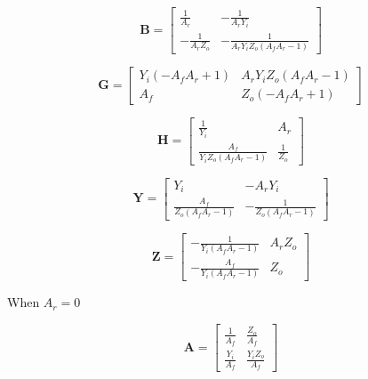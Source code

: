 \documentclass[a4paper, 12pt]{article}
\newcommand{\mat}[1]{\mathbf{#1}}
\begin{document}
\begin{equation}
\mat{B} = \left[\begin{matrix}\frac{1}{A_{r}} & - \frac{1}{A_{r} Y_{i}}\\- \frac{1}{A_{r} Z_{o}} & - \frac{1}{A_{r} Y_{i} Z_{o} \left(A_{f} A_{r} - 1\right)}\end{matrix}\right]
\end{equation}

\begin{equation}
\mat{G} = \left[\begin{matrix}Y_{i} \left(- A_{f} A_{r} + 1\right) & A_{r} Y_{i} Z_{o} \left(A_{f} A_{r} - 1\right)\\A_{f} & Z_{o} \left(- A_{f} A_{r} + 1\right)\end{matrix}\right]
\end{equation}

\begin{equation}
\mat{H} = \left[\begin{matrix}\frac{1}{Y_{i}} & A_{r}\\\frac{A_{f}}{Y_{i} Z_{o} \left(A_{f} A_{r} - 1\right)} & \frac{1}{Z_{o}}\end{matrix}\right]
\end{equation}

\begin{equation}
\mat{Y} = \left[\begin{matrix}Y_{i} & - A_{r} Y_{i}\\\frac{A_{f}}{Z_{o} \left(A_{f} A_{r} - 1\right)} & - \frac{1}{Z_{o} \left(A_{f} A_{r} - 1\right)}\end{matrix}\right]
\end{equation}

\begin{equation}
\mat{Z} = \left[\begin{matrix}- \frac{1}{Y_{i} \left(A_{f} A_{r} - 1\right)} & A_{r} Z_{o}\\- \frac{A_{f}}{Y_{i} \left(A_{f} A_{r} - 1\right)} & Z_{o}\end{matrix}\right]
\end{equation}


When $A_r=0$

\begin{equation}
\mat{A} = \left[\begin{matrix}\frac{1}{A_{f}} & \frac{Z_{o}}{A_{f}}\\\frac{Y_{i}}{A_{f}} & \frac{Y_{i} Z_{o}}{A_{f}}\end{matrix}\right]
\end{equation}
\end{document}
